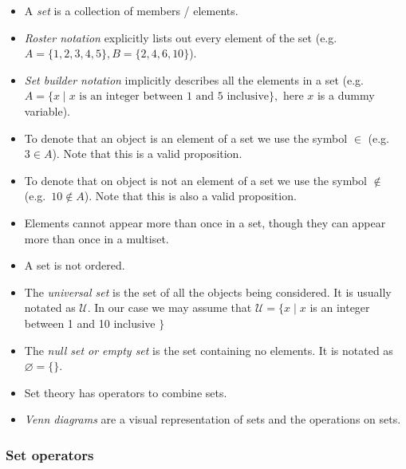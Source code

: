 \begin{itemize}
\tightlist
\item
  A \emph{set} is a collection of members / elements.
\item
  \emph{Roster notation} explicitly lists out every element of the set
  (e.g.~\(A=\{1,2,3,4,5\}, B=\{2,4,6,10\}\)).
\item
  \emph{Set builder notation} implicitly describes all the elements in a
  set
  (e.g.~\(A=\{x \mid x\text{ is an integer between 1 and 5 inclusive}\},\)
  here \(x\) is a dummy variable).
\item
  To denote that an object is an element of a set we use the symbol
  \(\in\) (e.g.~\(3 \in A\)). Note that this is a valid proposition.
\item
  To denote that on object is not an element of a set we use the symbol
  \(\not\in\) (e.g.~\(10 \not\in A\)). Note that this is also a valid
  proposition.
\item
  Elements cannot appear more than once in a set, though they can appear
  more than once in a multiset.
\item
  A set is not ordered.
\item
  The \emph{universal set} is the set of all the objects being
  considered. It is usually notated as \(\mathcal{U}\). In our case we
  may assume that \(\mathcal{U} = \{x \mid x\) is an integer between 1
  and 10 inclusive \(\}\)
\item
  The \emph{null set or empty set} is the set containing no elements. It
  is notated as \(\varnothing = \{ \}\).
\item
  Set theory has operators to combine sets.
\item
  \emph{Venn diagrams} are a visual representation of sets and the
  operations on sets.
\end{itemize}

\hypertarget{set-operators}{%
\subsubsection{Set operators}\label{set-operators}}

